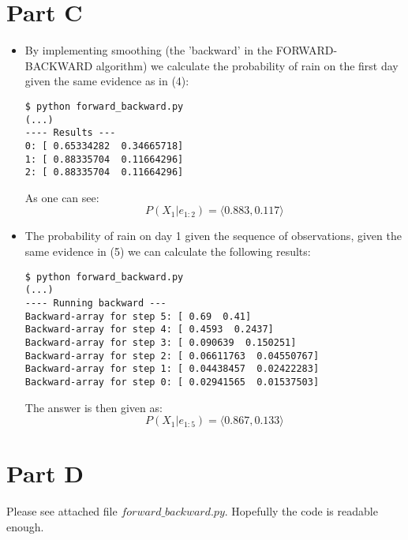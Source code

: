\documentclass{article}
\begin{document}
\section*{Part C}

\begin{itemize}

\item By implementing smoothing (the 'backward' in the FORWARD-BACKWARD algorithm) we calculate the probability
of rain on the first day given the same evidence as in (4):

\begin{verbatim}
$ python forward_backward.py
(...)
---- Results ---
0: [ 0.65334282  0.34665718]
1: [ 0.88335704  0.11664296]
2: [ 0.88335704  0.11664296]
\end{verbatim}

As one can see:
\begin{equation}
P(X_1|e_{1:2}) = \langle0.883,0.117\rangle
\end{equation}

\item The probability of rain on day 1 given the sequence of observations, given the same evidence in (5) we
can calculate the following results:

\begin{verbatim}
$ python forward_backward.py
(...)
---- Running backward ---
Backward-array for step 5: [ 0.69  0.41] 
Backward-array for step 4: [ 0.4593  0.2437] 
Backward-array for step 3: [ 0.090639  0.150251] 
Backward-array for step 2: [ 0.06611763  0.04550767] 
Backward-array for step 1: [ 0.04438457  0.02422283] 
Backward-array for step 0: [ 0.02941565  0.01537503]
\end{verbatim}

The answer is then given as:
\begin{equation}
P(X_1|e_{1:5}) = \langle0.867, 0.133\rangle
\end{equation}
\end{itemize}

\section*{Part D}

Please see attached file {\bf $forward\_backward.py$}.
Hopefully the code is readable enough.
\end{document}
